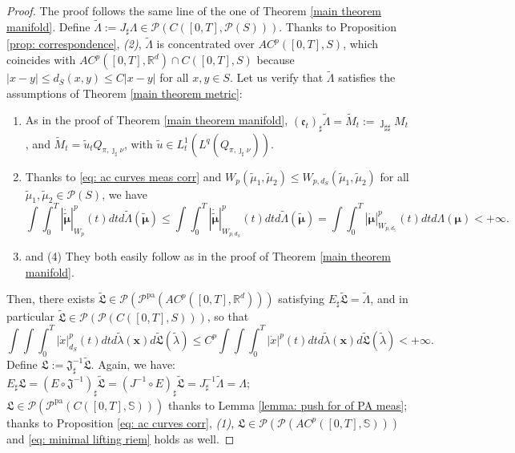 \documentclass[10pt,leqno]{amsart}
\numberwithin{equation}{section}
\newcommand{\R}{\mathbb{R}}
\newcommand{\PP}{\mathcal{P}}
\newcommand{\PPpa}{\PP^{\operatorname{pa}}}
\newcommand{\Ss}{\mathbb{S}}
\begin{document}
\begin{proof}
    The proof follows the same line of the one of Theorem \ref{main theorem manifold}. Define $\tilde{\Lambda} := J_\sharp \Lambda \in \PP(C([0,T],\PP(S)))$. Thanks to Proposition \ref{prop: correspondence}, \textit{(2)}, $\tilde\Lambda$ is concentrated over $AC^p([0,T],S)$, which coincides with $AC^p([0,T],\R^d) \cap C([0,T],S)$ because $|x-y| \leq d_S(x,y) \leq C|x-y|$ for all $x,y \in S$. Let us verify that $\tilde\Lambda$ satisfies the assumptions of Theorem \ref{main theorem metric}:
    \begin{enumerate}
        \item As in the proof of Theorem \ref{main theorem manifold}, $(\mathfrak{e}_t)_\sharp \tilde\Lambda = \tilde{M}_t := \jmath_{\sharp\sharp} M_t$, and $\tilde{M}_t = \tilde{u}_t Q_{\pi,\jmath_\sharp \nu}$, with $\tilde{u}\in L^1_t(L^q(Q_{\pi,\jmath_\sharp \nu}))$.
        \item Thanks to \eqref{eq: ac curves meas corr} and $W_p(\tilde{\mu}_1,\tilde{\mu}_2) \leq  W_{p,d_S}(\tilde{\mu}_1,\tilde{\mu}_2)$ for all $\tilde{\mu}_1,\tilde{\mu}_2 \in \PP(S)$, we have 
        \[\int\int_0^T |\boldsymbol{\dot{\tilde\mu}}|_{W_p}^p(t)dt d\tilde{\Lambda}(\boldsymbol{\tilde\mu}) \leq  \int\int_0^T |\boldsymbol{\dot{\tilde\mu}}|_{W_{p,d_S}}^p(t)dt d\tilde{\Lambda}(\boldsymbol{\tilde\mu}) =  \int\int_0^T |\dot{\boldsymbol{\mu}}|_{W_{p,d_\Ss}}^p(t)dt d\Lambda(\boldsymbol{\mu}) <+\infty. \]
        \item[(3)]and (4) They both easily follow as in the proof of Theorem \ref{main theorem manifold}.
    \end{enumerate}
    Then, there exists $\tilde{\mathfrak{L}} \in \PP(\PPpa(AC^p([0,T],\R^d)))$ satisfying $E_\sharp \tilde{\mathfrak{L}} = \tilde\Lambda$, and in particular $\tilde{\mathfrak{L}} \in \PP(\PP(C([0,T],S)))$, so that 
    \[\int \int \int_0^T |\dot{x}|_{d_S}^p(t) dt d\tilde{\lambda}(\boldsymbol{x}) d\tilde{\mathfrak{L}}(\tilde\lambda) \leq C^p \int \int \int_0^T |\dot{x}|^p(t) dt d\tilde{\lambda}(\boldsymbol{x}) d\tilde{\mathfrak{L}}(\tilde\lambda)<+\infty.\]
    Define $\mathfrak{L}:= \mathfrak{J}^{-1}_\sharp \tilde{\mathfrak{L}}$. Again, we have: $E_\sharp \mathfrak{L} = (E\circ \mathfrak{J}^{-1})_\sharp \tilde{\mathfrak{L}} = (J^{-1} \circ E)_\sharp \tilde{\mathfrak{L}} = J^{-1}_\sharp \tilde\Lambda = \Lambda$; $\mathfrak{L}\in \PP(\PPpa(C([0,T],\Ss)))$ thanks to Lemma \ref{lemma: push for of PA meas}; thanks to Proposition \ref{eq: ac curves corr}, \textit{(1)}, $\mathfrak{L}\in \PP(\PP(AC^p([0,T],\Ss)))$ and \eqref{eq: minimal lifting riem} holds as well.
\end{proof}
\end{document}
